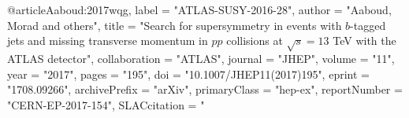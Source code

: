 @article{Aaboud:2017wqg,
      label          = "ATLAS-SUSY-2016-28",
      author         = "Aaboud, Morad and others",
      title          = "{Search for supersymmetry in events with $b$-tagged jets
                        and missing transverse momentum in $pp$ collisions at
                        $\sqrt{s}=13$ TeV with the ATLAS detector}",
      collaboration  = "ATLAS",
      journal        = "JHEP",
      volume         = "11",
      year           = "2017",
      pages          = "195",
      doi            = "10.1007/JHEP11(2017)195",
      eprint         = "1708.09266",
      archivePrefix  = "arXiv",
      primaryClass   = "hep-ex",
      reportNumber   = "CERN-EP-2017-154",
      SLACcitation   = "%
}

